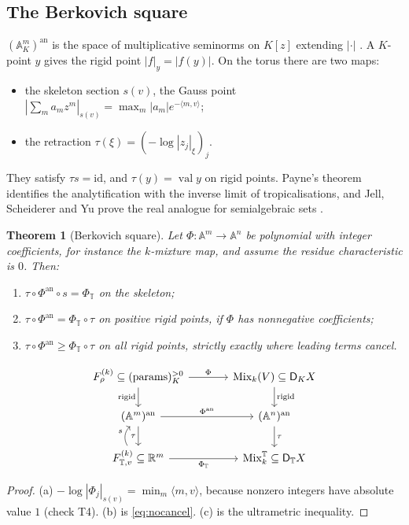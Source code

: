 \documentclass[11pt]{article}
\newtheorem{theorem}{Theorem}[section]
\theoremstyle{definition}
\newcommand{\DT}{\mathsf D_{\mathbb T}}
\newcommand{\DK}{\mathsf D_{K}}
\newcommand{\T}{\mathbb T}
\newcommand{\R}{\mathbb R}
\newcommand{\id}{\mathrm{id}}
\newcommand{\val}{\operatorname{val}}
\newcommand{\Mix}{\operatorname{Mix}}
\newcommand{\an}{\mathrm{an}}
\begin{document}
\subsection{The Berkovich square}
$(\mathbb A^m_K)^\an$ is the space of multiplicative seminorms on $K[z]$ extending $|\cdot|$ \cite{Berkovich1990}. A $K$-point $y$
gives the rigid point $|f|_y=|f(y)|$. On the torus there are two maps:
\begin{itemize}
\item the skeleton section $s(v)$, the Gauss point $|\sum_ma_mz^m|_{s(v)}=\max_m|a_m|e^{-\langle m,v\rangle}$;
\item the retraction $\tau(\xi)=(-\log|z_j|_\xi)_j$.
\end{itemize}
They satisfy $\tau s=\id$, and $\tau(y)=\val y$ on rigid points. Payne's theorem \cite{Payne2009} identifies the analytification with the
inverse limit of tropicalisations, and Jell, Scheiderer and Yu prove the real analogue for semialgebraic sets
\cite{JellScheidererYu2022}.

\begin{theorem}[Berkovich square]\label{thm:berk}
Let $\Phi\colon\mathbb A^m\to\mathbb A^n$ be polynomial with integer coefficients, for instance the $k$-mixture map, and assume the
residue characteristic is $0$. Then:
\begin{enumerate}[label=(\alph*)]
\item $\tau\circ\Phi^\an\circ s=\Phi_\T$ on the skeleton;
\item $\tau\circ\Phi^\an=\Phi_\T\circ\tau$ on positive rigid points, if $\Phi$ has nonnegative coefficients;
\item $\tau\circ\Phi^\an\ge\Phi_\T\circ\tau$ on all rigid points, strictly exactly where leading terms cancel.
\end{enumerate}
\[
\begin{tikzcd}[column sep=large]
F^{(k)}_\rho\subseteq(\text{params})^{>0}_K \arrow[r,"\Phi"]\arrow[d,"\text{rigid}"'] & \Mix_k(V)\subseteq\DK X\arrow[d,"\text{rigid}"]\\
(\mathbb A^m)^\an \arrow[r,"\Phi^\an"]\arrow[d,"\tau"'] & (\mathbb A^n)^\an\arrow[d,"\tau"]\\
F^{(k)}_{\T,v}\subseteq\R^m \arrow[r,"\Phi_\T"'] \arrow[u, bend left=40, "s"] & \Mix^\T_k\subseteq\DT X
\end{tikzcd}
\]
\end{theorem}
\begin{proof}
(a) $-\log|\Phi_j|_{s(v)}=\min_m\langle m,v\rangle$, because nonzero integers have absolute value $1$ (check T4). (b) is
\eqref{eq:nocancel}. (c) is the ultrametric inequality.
\end{proof}
\end{document}
